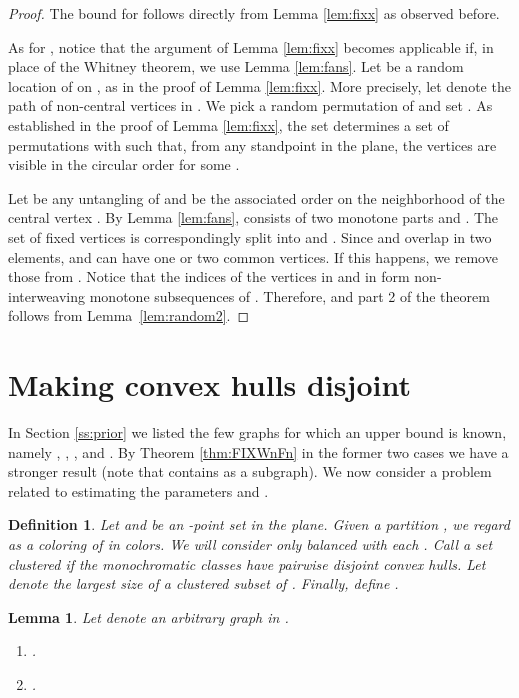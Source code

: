 \documentclass[reqno,12pt]{amsart}
\newtheorem{lemma}[theorem]{Lemma}
\newtheorem{definition}[theorem]{Definition}
\newenvironment{bfenumerate}{\renewcommand{\labelenumi}{{\bf\theenumi.}}\renewcommand{\labelenumii}{{\bf(\theenumii)}}\begin{enumerate}}{\end{enumerate}}
\begin{document}
\begin{proof}
The bound for  follows directly from Lemma \ref{lem:fixx} as observed before.

As for , notice that the argument of Lemma \ref{lem:fixx} becomes applicable
if, in place of the Whitney theorem, we use Lemma \ref{lem:fans}.
Let  be a random location of  on , as in the proof
of Lemma \ref{lem:fixx}. 
More precisely, let  denote the path of non-central vertices
in . We pick a random permutation  of  and set
. As established in the proof of Lemma \ref{lem:fixx},
the set  determines a set of permutations  with 
such that, from any standpoint  in the plane, the vertices 
 are visible in the circular order 
for some .

Let  be any untangling of  and 
be the associated order on the neighborhood of the central vertex .
By Lemma \ref{lem:fans},  consists of two monotone parts
 and . The set  of fixed vertices is correspondingly
split into  and .
Since  and  overlap in two elements,
 and  can have one or two common vertices. If this happens,
we remove those from .
Notice that the indices of the vertices in  and in  form
non-interweaving monotone subsequences of . 
Therefore, 
and part 2 of the theorem follows from Lemma~\ref{lem:random2}.
\end{proof}


\section{Making convex hulls disjoint}\label{s:hulls}

In Section \ref{ss:prior} we listed the few graphs for which an upper
bound  is known, namely , , , and .
By Theorem \ref{thm:FIXWnFn} in the former two cases we have a stronger
result  (note that  contains  as a subgraph).
We now consider a problem related to estimating the parameters 
and . 

\begin{definition}\label{def:CX}\rm
Let  and  be an -point set in the plane.
Given a partition , we regard  
as a coloring of  in  colors.
We will consider only \emph{balanced}  with each .
Call a set  \emph{clustered} if the monochromatic classes
 have pairwise disjoint convex hulls.
Let  denote the largest size of a clustered subset of .
Finally, define .
\end{definition}

\begin{lemma}\label{lem:fixxC}
Let  denote an arbitrary graph in .
\begin{bfenumerate}
\item
.
\item
.
\end{bfenumerate}
\end{lemma}
\end{document}
